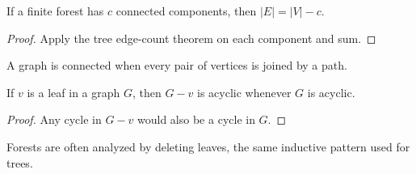 \begin{theorem}
If a finite forest has $c$ connected components, then $|E| = |V| - c$.
\end{theorem}

\begin{proof}
Apply the tree edge-count theorem on each component and sum.
\end{proof}

\begin{definition}
A graph is connected when every pair of vertices is joined by a path.
\end{definition}

\begin{lemma}
If $v$ is a leaf in a graph $G$, then $G-v$ is acyclic whenever $G$ is acyclic.
\end{lemma}

\begin{proof}
Any cycle in $G-v$ would also be a cycle in $G$.
\end{proof}

\begin{remark}
Forests are often analyzed by deleting leaves, the same inductive pattern used for trees.
\end{remark}
